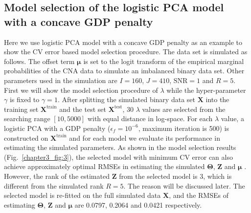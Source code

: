 \subsection{Model selection of the logistic PCA model with a concave GDP penalty}
Here we use logistic PCA model with a concave GDP penalty as an example to show the CV error based model selection procedure. The data set is simulated as follows. The offset term $\bm{\mu}$ is set to the logit transform of the empirical marginal probabilities of the CNA data to simulate an imbalanced binary data set. Other parameters used in the simulation are $I=160$, $J=410$, $\text{SNR}=1$ and $R=5$. First we will show the model selection procedure of $\lambda$ while the hyper-parameter $\gamma$ is fixed to $\gamma=1$. After splitting the simulated binary data set $\mathbf{X}$ into the training set $\mathbf{X}^{\text{train}}$ and the test set $\mathbf{X}^{\text{test}}$, 30 $\lambda$ values are selected from the searching range $[10,5000]$ with equal distance in log-space. For each $\lambda$ value, a logistic PCA with a GDP penalty ($\epsilon_f = 10^{-6}$, maximum iteration is 500) is constructed on $\mathbf{X}^{\text{train}}$ and for each model we evaluate its performance in estimating the simulated parameters. As shown in the model selection results (Fig.~\ref{chapter3_fig:3}), the selected model with minimum CV error can also achieve approximately optimal RMSEs in estimating the simulated $\mathbf{\Theta}$, $\mathbf{Z}$ and $\bm{\mu}$ . However, the rank of the estimated $\mathbf{Z}$ from the selected model is 3, which is different from the simulated rank $R=5$. The reason will be discussed later. The selected model is re-fitted on the full simulated data $\mathbf{X}$, and the RMSEs of estimating $\mathbf{\Theta}$, $\mathbf{Z}$ and $\bm{\mu}$ are 0.0797, 0.2064 and 0.0421 respectively.

